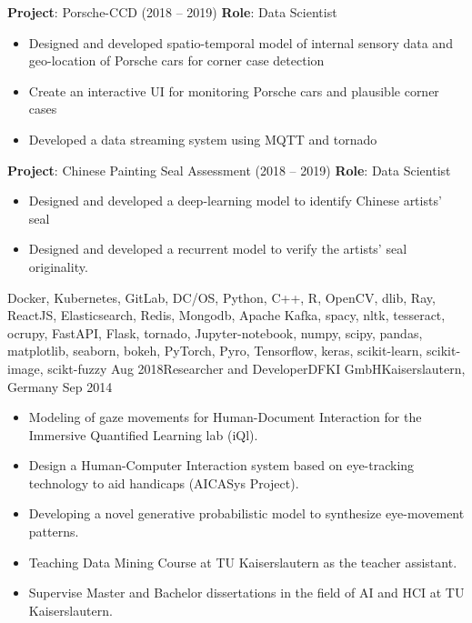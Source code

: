 \begin{experiences}
{    \textbf{Project}: Porsche-CCD (2018 -- 2019)\newline
    \textbf{Role}: Data Scientist
        \begin{itemize}
          \item Designed and developed spatio-temporal model of internal sensory data and geo-location of Porsche cars for corner case detection
          \item Create an interactive UI for monitoring Porsche cars and plausible corner cases
          \item Developed a data streaming system using MQTT and tornado
        \end{itemize}
       \vspace{0.1cm}

    \textbf{Project}: Chinese Painting Seal Assessment (2018 -- 2019)\newline
    \textbf{Role}: Data Scientist
        \begin{itemize}
          \item Designed and developed a deep-learning model to identify Chinese artists' seal
          \item Designed and developed a recurrent model to verify the artists' seal originality.
        \end{itemize}
  }
    {Docker, Kubernetes, GitLab, DC/OS, Python, C++, R,  OpenCV, dlib, Ray, ReactJS, Elasticsearch, Redis, Mongodb, Apache Kafka, spacy, nltk, tesseract, ocrupy, FastAPI, Flask, tornado, Jupyter-notebook, numpy, scipy, pandas, matplotlib, seaborn, bokeh, PyTorch, Pyro, Tensorflow, keras, scikit-learn, scikit-image, scikt-fuzzy}
    \emptySeparator
  \experience
  {Aug 2018}{Researcher and Developer}{DFKI GmbH}{Kaiserslautern, Germany}
  {Sep 2014} {
    \begin{itemize}
      \item Modeling of gaze movements for Human-Document Interaction for the Immersive Quantified Learning lab (iQl).
      \item Design a Human-Computer Interaction system based on eye-tracking technology to aid handicaps (AICASys Project).
      \item Developing a novel generative probabilistic model to synthesize eye-movement patterns.
      \item Teaching Data Mining Course at TU Kaiserslautern as the teacher assistant.
    \item Supervise Master and Bachelor dissertations in the field of AI and HCI at TU Kaiserslautern.


\end{itemize}}
\end{experiences}
